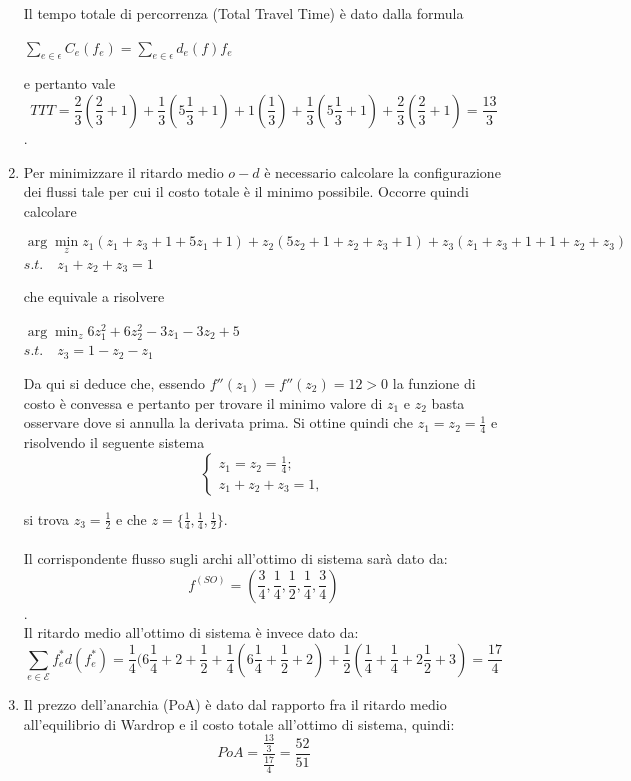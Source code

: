 \documentclass[13pt,largemargins]{homework}
\newcommand{\argmin}{\arg\!\min}
\begin{document}
\begin{enumerate}[label=(\alph*)]
Il tempo totale di percorrenza (Total Travel Time) è dato dalla formula
\begin{center}
$\sum_{e \in \epsilon} C_e(f_e) =  \sum_{e \in \epsilon} d_e(f)f_e$
\end{center} e pertanto vale \[TTT=\frac{2}{3}(\frac{2}{3}+1) + \frac{1}{3}(5\frac{1}{3}+1) + 1(\frac{1}{3}) + \frac{1}{3}(5\frac{1}{3}+1) + \frac{2}{3}(\frac{2}{3}+1) =\frac{13}{3}\]. 
\item %
Per minimizzare il ritardo medio \(o - d\) è necessario calcolare la configurazione dei flussi tale per cui il costo totale è il minimo possibile. Occorre quindi calcolare 
\begin{center}
\[ \argmin_z z_1(z_1 + z_3 + 1 + 5z_1 + 1) + z_2(5z_2+1+z_2+z_3+1) + z_3(z_1+z_3+1+1+z_2+z_3)\] 
$s.t. \quad z_1+z_2+z_3 = 1$
\end{center} 
che equivale a risolvere 
\begin{center}
\(\argmin_z 6z_1^2 + 6z_2^2 - 3z_1 -3z_2 + 5 \)\\
$s.t. \quad z_3 = 1-z_2 - z_1$
\end{center} 
Da qui si deduce che, essendo $f''(z_1) = f''(z_2) = 12 > 0$  la funzione di costo è convessa e pertanto per trovare il minimo valore di $z_1$ e $z_2$ basta osservare dove si annulla la derivata prima. Si ottine quindi che $z_1 = z_2 = \frac{1}{4}$ e risolvendo il seguente sistema 
\begin{equation}
\begin{cases}
		z_1 = z_2 = \frac{1}{4}; \\
		z_1+z_2+z_3=1,
\end{cases}
\end{equation}

si trova $z_3 = \frac{1}{2}$ e che $z=\{\frac{1}{4}, \frac{1}{4}, \frac{1}{2}\}$.\\\\
Il corrispondente flusso sugli archi all'ottimo di sistema sarà dato da: \[f^{(SO)}=(\frac{3}{4},\frac{1}{4},\frac{1}{2}, \frac{1}{4}, \frac{3}{4})\].\\
Il ritardo medio all'ottimo di sistema è invece dato da: \[\sum_{e\in \mathcal{E}}f_e^* d(f_e^*)=\frac{1}{4}(6\frac{1}{4}+2+\frac{1}{2}+\frac{1}{4}(6\frac{1}{4}+\frac{1}{2}+2)+ \frac{1}{2}(\frac{1}{4}+\frac{1}{4}+2\frac{1}{2}+3)=\frac{17}{4}\]

\item Il prezzo dell'anarchia (PoA) è dato dal rapporto fra il ritardo medio all'equilibrio di Wardrop e il costo totale all'ottimo di sistema, quindi:
\[PoA=\frac{\frac{13}{3}}{\frac{17}{4}}=\frac{52}{51}\]


\end{enumerate}
\end{document}
